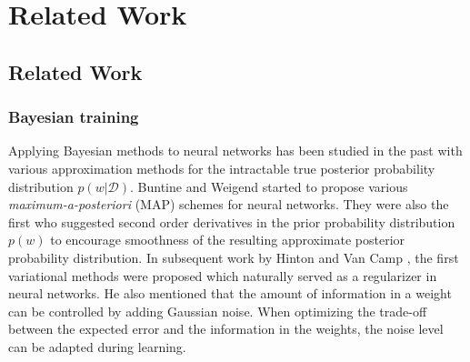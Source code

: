 \chapter{Related Work}

\ifpdf
    \graphicspath{{Chapter3/Figs/Raster/}{Chapter3/Figs/PDF/}{Chapter3/Figs/}}
\else
    \graphicspath{{Chapter3/Figs/Vector/}{Chapter3/Figs/}}
\fi


\pagebreak

\section{Related Work}

\subsection{Bayesian training}
Applying Bayesian methods to neural networks has been studied in the past with various approximation methods for the intractable true posterior probability distribution $p(w|\mathcal{D})$. Buntine and Weigend \cite{buntine1991bayesian} started to propose various \textit{maximum-a-posteriori} (MAP) schemes for neural networks. They were also the first who suggested second order derivatives in the prior probability distribution $p(w)$ to encourage smoothness of the resulting approximate posterior probability distribution.
In subsequent work by Hinton and Van Camp \cite{hinton1993keeping}, the first variational methods were proposed which naturally served as a regularizer in neural networks. He also mentioned that the amount of information in a weight can be controlled by adding Gaussian noise. When optimizing the trade-off between the expected error and the information in the weights, the noise level can be adapted during learning.


